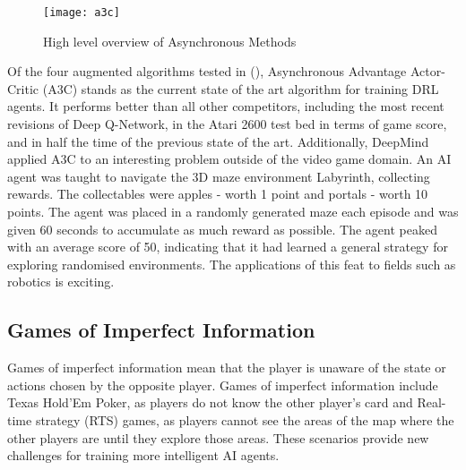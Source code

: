 \begin{figure}[H]
    \centering
    \texttt{[image: a3c]}
    \caption{High level overview of Asynchronous Methods}
\end{figure}

Of the four augmented algorithms tested in (\cite{a3c}), Asynchronous Advantage Actor-Critic (A3C) stands as the current state of the art algorithm for training DRL agents. It performs better than all other competitors, including the most recent revisions of Deep Q-Network, in the Atari 2600 test bed in terms of game score, and in half the time of the previous state of the art. Additionally, DeepMind applied A3C to an interesting problem outside of the video game domain. An AI agent was taught to navigate the 3D maze environment Labyrinth, collecting rewards. The collectables were apples - worth 1 point and portals - worth 10 points. The agent was placed in a randomly generated maze each episode and was given 60 seconds to accumulate as much reward as possible. The agent peaked with an average score of 50, indicating that it had learned a general strategy for exploring randomised environments. The applications of this feat to fields such as robotics is exciting.

\subsection{Games of Imperfect Information}
Games of imperfect information mean that the player is unaware of the state or actions chosen by the opposite player. Games of imperfect information include Texas Hold'Em Poker, as players do not know the other player's card and Real-time strategy (RTS) games, as players cannot see the areas of the map where the other players are until they explore those areas. These scenarios provide new challenges for training more intelligent AI agents.

